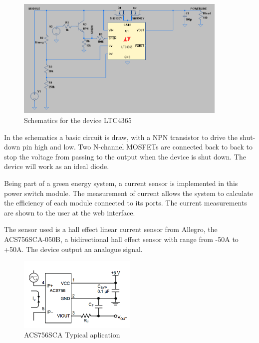 \begin{figure}[H]
	\begin{centering}
		\includegraphics[width=0.9\textwidth]{images/tb5_LTC_simu1.png}
		\caption{Schematics for the device LTC4365}
	\end{centering}
\end{figure}

In the schematics a basic circuit is draw, with a NPN transistor to drive the shut-down pin high and low. Two N-channel MOSFETs are connected back to back to  stop the voltage from passing to the output when the device is shut down. The device will work as an ideal diode.



Being part of a green energy system, a current sensor is implemented in this power switch module. The measurement of current allows the system to calculate the efficiency of each module connected to its ports. The current measurements are shown to the user at the web interface.

The sensor used is a hall effect linear current sensor from Allegro, the ACS756SCA-050B, a bidirectional hall effect sensor with range from -50A to +50A. The device output an analogue signal.

\begin{figure}[H]
	\begin{centering}
		\includegraphics[width=0.5\textwidth]{images/current_sensor.png}
		\caption{ACS756SCA Typical aplication}
	\end{centering}
\end{figure}
%
%
%
